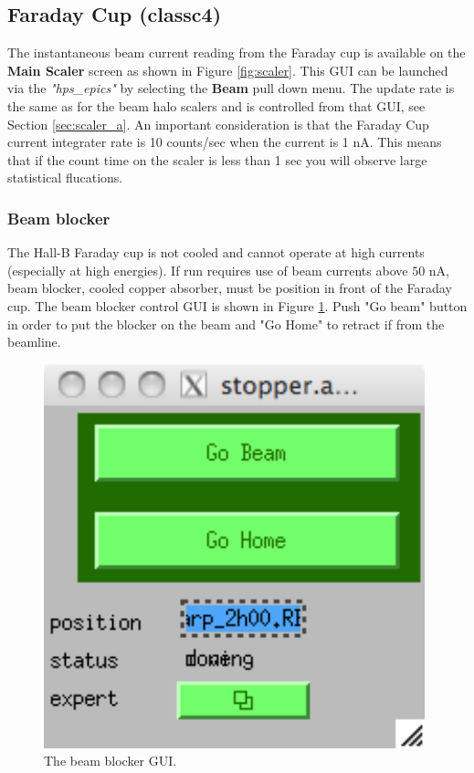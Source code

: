 \documentclass[12pt]{article}
\begin{document}
\subsection{Faraday Cup (classc4) \label{sec:fcup}}

The instantaneous beam current reading from the Faraday cup is available on
the \textbf{Main Scaler} screen as shown in Figure \ref{fig:scaler}. This GUI can be launched
via the \emph{"hps\_epics"} by selecting the \textbf{Beam}
pull down menu. The update rate is the same as for the beam halo scalers and
is controlled from that GUI, see Section \ref{sec:scaler_a}. An important consideration
is that the Faraday Cup current integrater rate is 10 counts/sec when the current
is 1 nA. This means that if the count time on the scaler is less than 1 sec
you will observe large statistical flucations.


\subsubsection{Beam blocker}

The Hall-B Faraday cup is not cooled and cannot operate at high currents (especially at high energies). If run requires use of beam currents above $50$ nA, beam blocker, cooled copper absorber, must be position in front of the Faraday cup. The beam blocker control GUI is shown in Figure \ref{beamblocker}.  Push "Go beam" button  in order to put the blocker on the beam and "Go Home" to retract if from the beamline. 

\begin{figure}[tbhp]
{\centering \includegraphics[scale=0.75]{beam_stopper.pdf} \par}
\caption{The beam blocker GUI. \label{beamblocker}}
\end{figure}
\end{document}
